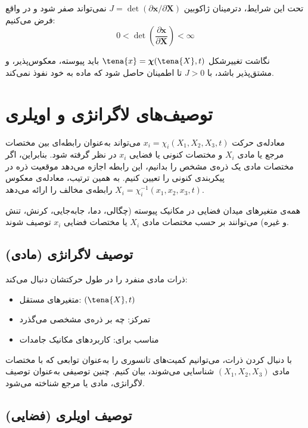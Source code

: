 تحت این شرایط، دترمینان ژاکوبین $J = \det(\partial \mathbf{x}/\partial \mathbf{X})$ نمی‌تواند صفر شود و در واقع فرض می‌کنیم:
\begin{equation}
	0 < \det\left(\frac{\partial \mathbf{x}}{\partial \mathbf{X}}\right) < \infty
\end{equation}

\begin{keypoint}
	نگاشت تغییرشکل $\tena{x} = \boldsymbol{\chi}(\tena{X}, t)$ باید پیوسته، معکوس‌پذیر، و مشتق‌پذیر باشد، با $J > 0$ تا اطمینان حاصل شود که ماده به خود نفوذ نمی‌کند.
\end{keypoint}

\section{توصیف‌های لاگرانژی و اویلری}

معادله‌ی حرکت $x_i = \chi_i(X_1, X_2, X_3, t)$ می‌تواند به‌عنوان رابطه‌ای بین مختصات مرجع یا مادی $X_i$ و مختصات کنونی یا فضایی $x_i$ در نظر گرفته شود. بنابراین، اگر مختصات مادی یک ذره‌ی مشخص را بدانیم، این رابطه اجازه می‌دهد موقعیت ذره در پیکربندی کنونی را تعیین کنیم. به همین ترتیب، معادله‌ی معکوس $X_i = \chi_i^{-1}(x_1, x_2, x_3, t)$ رابطه‌ی مخالف را ارائه می‌دهد.

همه‌ی متغیرهای میدان فضایی در مکانیک پیوسته (چگالی، دما، جابه‌جایی، کرنش، تنش و غیره) می‌توانند بر حسب مختصات مادی $X_i$ یا مختصات فضایی $x_i$ توصیف شوند.

\subsection{توصیف لاگرانژی (مادی)}

ذرات مادی منفرد را در طول حرکتشان دنبال می‌کند:
\begin{itemize}
	\item متغیرهای مستقل: $(\tena{X}, t)$
	\item تمرکز: چه بر ذره‌ی مشخصی می‌گذرد
	\item مناسب برای: کاربردهای مکانیک جامدات
\end{itemize}

با دنبال کردن ذرات، می‌توانیم کمیت‌های تانسوری را به‌عنوان توابعی که با مختصات مادی $(X_1, X_2, X_3)$ شناسایی می‌شوند، بیان کنیم. چنین توصیفی به‌عنوان توصیف لاگرانژی، مادی یا مرجع شناخته می‌شود.

\subsection{توصیف اویلری (فضایی)}

